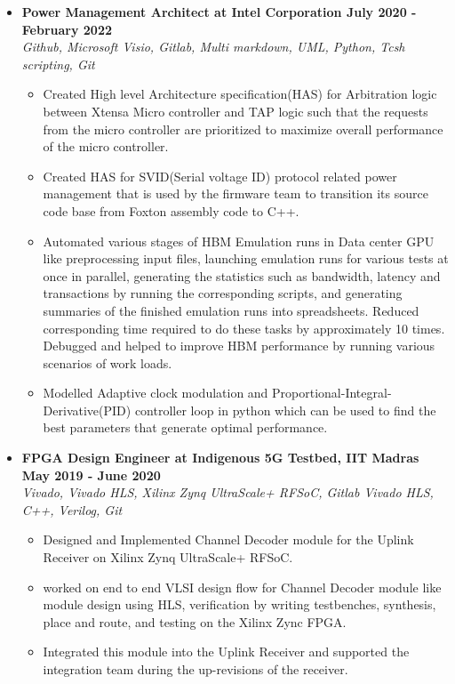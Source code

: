 \documentclass[a4paper,11pt]{article}
\newcommand{\isep}{-2 pt}
\newcommand{\spsep}{-0.75cm}
\begin{document}
\begin{itemize}
	\item \textbf{Power Management Architect at Intel Corporation \hfill July 2020 - February 2022} \\
	\emph{Github, Microsoft Visio, Gitlab,  \hfill Multi markdown, UML, Python, Tcsh scripting, Git} \\[\spsep]
		\begin{itemize} \itemsep \isep
			\item Created High level Architecture specification(HAS) for Arbitration logic between Xtensa Micro controller and TAP logic such that the requests from the micro controller are prioritized to maximize overall performance of the micro controller.
			\item Created HAS for SVID(Serial voltage ID) protocol related power management that is used by the firmware team to transition its source code base from Foxton assembly code to C++.
			\item Automated various stages of HBM Emulation runs in Data center GPU like preprocessing input files, launching emulation runs for various tests at once in parallel, generating the statistics such as bandwidth, latency and transactions by running the corresponding scripts, and generating summaries of the finished emulation runs into spreadsheets. Reduced corresponding time required to do these tasks by  approximately 10 times. Debugged and helped to improve HBM performance by running various scenarios of work loads.		
			\item Modelled Adaptive clock modulation and Proportional-Integral-Derivative(PID) controller loop in python which can be used to find the best parameters that generate optimal performance.
		\end{itemize}
	
	\item \textbf{FPGA Design Engineer at Indigenous 5G Testbed, IIT Madras \hfill May 2019 - June 2020} \\
	\emph{Vivado, Vivado HLS, Xilinx Zynq UltraScale+ RFSoC, Gitlab \hfill Vivado HLS, C++, Verilog, Git} \\[\spsep]
	\begin{itemize} \itemsep \isep
		\item Designed and Implemented Channel Decoder module for the Uplink Receiver on Xilinx Zynq UltraScale+ RFSoC.
	\item worked on end to end VLSI design flow for Channel Decoder module like module design using HLS, verification by writing testbenches, synthesis, place and route, and testing on the Xilinx Zync FPGA.
	\item Integrated this module into the Uplink Receiver and supported the integration team during the up-revisions of the receiver.
	\end{itemize}


\end{itemize}
\end{document}
